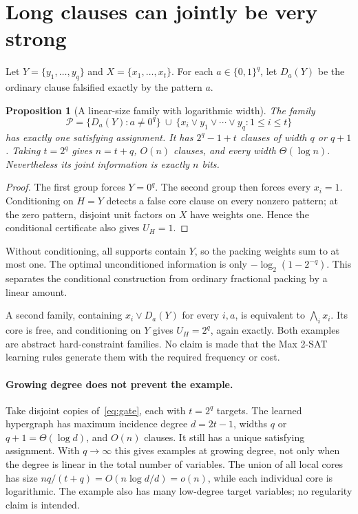 \documentclass[11pt,a4paper]{article}
\newtheorem{proposition}[theorem]{Proposition}
\theoremstyle{definition}
\theoremstyle{remark}
\newcommand{\Pcal}{\mathcal P}
\begin{document}
\section{Long clauses can jointly be very strong}

Let $Y=\{y_1,\ldots,y_q\}$ and $X=\{x_1,\ldots,x_t\}$.
For each $a\in\{0,1\}^q$, let $D_a(Y)$ be the ordinary clause falsified
exactly by the pattern $a$.

\begin{proposition}[A linear-size family with logarithmic width]
The family
\begin{equation}
 \Pcal=
 \{D_a(Y):a\ne0^q\}
 \ \cup\ 
 \{x_i\lor y_1\lor\cdots\lor y_q:1\le i\le t\}       \label{eq:gate}
\end{equation}
has exactly one satisfying assignment. It has $2^q-1+t$ clauses of
width $q$ or $q+1$. Taking $t=2^q$ gives $n=t+q$, $O(n)$ clauses,
and every width $\Theta(\log n)$. Nevertheless its joint information is
exactly $n$ bits.
\end{proposition}
\begin{proof}
The first group forces $Y=0^q$. The second group then forces every
$x_i=1$. Conditioning on $H=Y$ detects a false core clause on every
nonzero pattern; at the zero pattern, disjoint unit factors on $X$ have
weights one. Hence the conditional certificate also gives $U_H=1$.
\end{proof}

Without conditioning, all supports contain $Y$, so the packing weights
sum to at most one. The optimal unconditioned information is only
$-\log_2(1-2^{-q})$. This separates the conditional construction from
ordinary fractional packing by a linear amount.

A second family, containing $x_i\lor D_a(Y)$ for every $i,a$, is equivalent
to $\bigwedge_i x_i$. Its core is free, and conditioning on $Y$ gives
$U_H=2^q$, again exactly. Both examples are abstract hard-constraint
families. No claim is made that the Max 2-SAT learning rules generate
them with the required frequency or cost.

\paragraph{Growing degree does not prevent the example.}
Take disjoint copies of~\eqref{eq:gate}, each with $t=2^q$ targets.
The learned hypergraph has maximum incidence degree $d=2t-1$, widths
$q$ or $q+1=\Theta(\log d)$, and $O(n)$ clauses. It still has a unique
satisfying assignment. With $q\to\infty$ this gives examples at growing
degree, not only when the degree is linear in the total number of variables.
The union of all local cores has size
$nq/(t+q)=O(n\log d/d)=o(n)$, while each individual core is logarithmic.
The example also has many low-degree target variables; no regularity claim
is intended.
\end{document}
